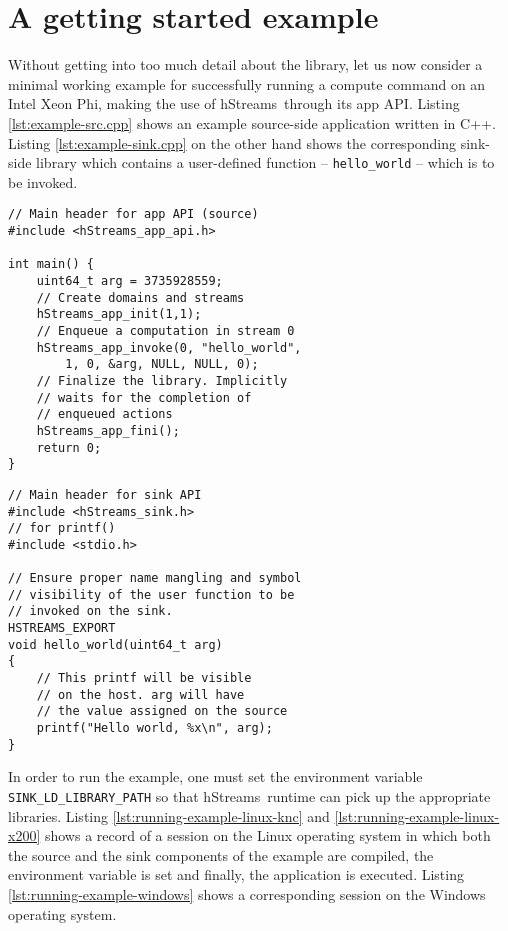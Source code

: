 \documentclass[a4,oneside]{book}
\newcommand{\ixp}{Intel\textregistered{} Xeon Phi\texttrademark{}}
\newcommand{\hstreams}{hStreams}
\begin{document}
\section{A getting started example}\label{sec:getting-started-example}
Without getting into too much detail about the library, let us now consider a minimal working example for successfully running a compute command on an \ixp, making the use of \hstreams\ through its app API.
Listing \ref{lst:example-src.cpp} shows an example source-side application written in C++.
Listing \ref{lst:example-sink.cpp} on the other hand shows the corresponding sink-side library which contains a user-defined function -- \texttt{hello\_world} -- which is to be invoked.

\noindent\begin{minipage}{.45\textwidth}
\begin{lstlisting}[style=CppListingStyle,caption=example\_src.cpp,label={lst:example-src.cpp}]
// Main header for app API (source)
#include <hStreams_app_api.h>

int main() {
    uint64_t arg = 3735928559;
    // Create domains and streams
    hStreams_app_init(1,1);
    // Enqueue a computation in stream 0
    hStreams_app_invoke(0, "hello_world",
        1, 0, &arg, NULL, NULL, 0);
    // Finalize the library. Implicitly
    // waits for the completion of
    // enqueued actions
    hStreams_app_fini();
    return 0;
}
\end{lstlisting}
\end{minipage}\hfill
\begin{minipage}{.45\textwidth}
\begin{lstlisting}[style=CppListingStyle,caption=example\_sink.cpp,label={lst:example-sink.cpp}]
// Main header for sink API
#include <hStreams_sink.h>
// for printf()
#include <stdio.h>

// Ensure proper name mangling and symbol
// visibility of the user function to be
// invoked on the sink.
HSTREAMS_EXPORT
void hello_world(uint64_t arg)
{
    // This printf will be visible
    // on the host. arg will have
    // the value assigned on the source
    printf("Hello world, %x\n", arg);
}
\end{lstlisting}
\end{minipage}

In order to run the example, one must set the environment variable \texttt{SINK\_LD\_LIBRARY\_PATH} so that \hstreams\ runtime can pick up the appropriate libraries.
Listing \ref{lst:running-example-linux-knc} and \ref{lst:running-example-linux-x200} shows a record of a session on the Linux operating system in which both the source and the sink components of the example are compiled, the environment variable is set and finally, the application is executed.
Listing \ref{lst:running-example-windows} shows a corresponding session on the Windows operating system.
\end{document}

